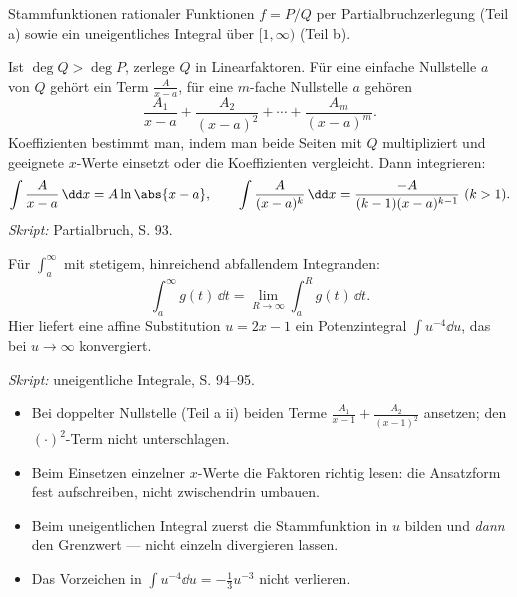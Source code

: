 

Stammfunktionen rationaler Funktionen $f=P/Q$ per Partialbruchzerlegung (Teil a)
sowie ein uneigentliches Integral über $[1,\infty)$ (Teil b).

\begin{werkzeugkasten}[Partialbruchzerlegung]
Ist $\deg Q>\deg P$, zerlege $Q$ in Linearfaktoren. Für eine einfache Nullstelle
$a$ von $Q$ gehört ein Term $\frac{A}{x-a}$, für eine $m$-fache Nullstelle
$a$ gehören
\begin{equation}
  \frac{A_1}{x-a}+\frac{A_2}{(x-a)^2}+\cdots+\frac{A_m}{(x-a)^m}.
\end{equation}
Koeffizienten bestimmt man, indem man beide Seiten mit $Q$ multipliziert und
geeignete $x$-Werte einsetzt oder die Koeffizienten vergleicht. Dann
integrieren:
\begin{equation}
  \int\frac{A}{x-a}\,\dd x=A\ln\abs{x-a},
  \qquad
  \int\frac{A}{(x-a)^k}\,\dd x=\frac{-A}{(k-1)(x-a)^{k-1}}\ (k>1).
\end{equation}
\textit{Skript:} Partialbruch, S. 93.
\end{werkzeugkasten}

\begin{werkzeugkasten}
Für $\int_a^\infty$ mit stetigem, hinreichend abfallendem Integranden:
\begin{equation}
  \int_a^\infty g(t)\,\dd t=\lim_{R\to\infty}\int_a^R g(t)\,\dd t .
\end{equation}
Hier liefert eine affine Substitution $u=2x-1$ ein Potenzintegral
$\int u^{-4}\dd u$, das bei $u\to\infty$ konvergiert.

\textit{Skript:} uneigentliche Integrale, S. 94--95.
\end{werkzeugkasten}

\begin{achtung}
\begin{itemize}
  \item Bei doppelter Nullstelle (Teil a ii) beiden Terme
        $\frac{A_1}{x-1}+\frac{A_2}{(x-1)^2}$ ansetzen; den $(\cdot)^2$-Term
        nicht unterschlagen.
  \item Beim Einsetzen einzelner $x$-Werte die Faktoren richtig lesen:
        die Ansatzform fest aufschreiben, nicht zwischendrin umbauen.
  \item Beim uneigentlichen Integral zuerst die Stammfunktion in $u$ bilden
        und \emph{dann} den Grenzwert — nicht einzeln divergieren lassen.
  \item Das Vorzeichen in $\int u^{-4}\dd u=-\tfrac13u^{-3}$ nicht verlieren.
\end{itemize}
\end{achtung}
